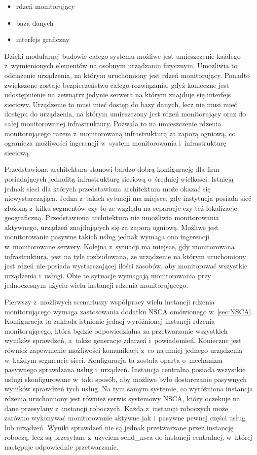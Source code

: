 \begin{itemize}
\item rdzeń monitorujący
\item baza danych
\item interfejs graficzny
\end{itemize}

Dzięki modularnej budowie całego systemu możliwe jest umieszczenie
każdego z~wymienionych elementów na osobnym urządzaniu fizycznym.
Umożliwia to odciążenie urządzenia, na którym uruchomiony jest rdzeń
monitorujący. Ponadto zwiększone zostaje bezpieczeństwo całego
rozwiązania, gdyż konieczne jest udostępnienie na zewnątrz jedynie
serwera na którym znajduje się interfejs sieciowy. Urządzenie to musi
mieć dostęp do bazy danych, lecz nie musi mieć dostępu do urządzenia,
na którym umieszczony jest rdzeń monitorujący oraz do całej
monitorowanej infrastruktury. Pozwala to na umieszczenie rdzenia
monitorującego razem z~monitorowaną infrastrukturą za zaporą ogniową,
co ogranicza możliwości ingerencji w~system monitorowania
i~infrastrukturę sieciową.

Przedstawiona architektura stanowi bardzo dobrą konfigurację dla firm
posiadających jednolitą infrastrukturę sieciową o~średniej
wielkości. Istnieją jednak sieci dla których przedstawiona
architektura może okazać się niewystarczająca. Jedna z~takich sytuacji
ma miejsce, gdy instytucja posiada sieć złożoną z~kilku segmentów czy
to ze względu na separacje czy też lokalizacje
geograficzną. Przedstawiona architektura nie umożliwia monitorowania
aktywnego, urządzeń znajdujących się za zaporą ogniową. Możliwe jest
monitorowanie pasywne takich usług jednak wymaga ono ingerencji
w~monitorowane serwery. Kolejna z~sytuacji ma miejsce, gdy
monitorowana infrastruktura, jest na tyle rozbudowana, że urządzenie
na którym uruchomiony jest rdzeń nie posiada wystarczającej ilości
zasobów, aby monitorować wszystkie urządzenia i~usługi. Obie te
sytuacje wymagają monitorowania przy jednoczesnym użyciu wielu
instancji rdzenia monitorującego.

Pierwszy z~możliwych scenariuszy współpracy wielu instancji rdzenia
monitorującego wymaga zastosowania dodatku NSCA omówionego
w~\ref{sec:NSCA}. Konfiguracja ta zakłada istnienie jednej wyróżnionej
instancji rdzenia monitorującego, która będzie odpowiedzialna za
przetwarzanie wszystkich wyników sprawdzeń, a~także generacje zdarzeń
i~powiadomień. Konieczne jest również zapewnienie możliwości
komunikacji z~co najmniej jednego urządzenia w~każdym segmencie
sieci. Konfiguracja ta została oparta o~mechanizm pasywnego sprawdzana
usług i~urządzeń. Instancja centralna posiada wszystkie usługi
skonfigurowane w~taki sposób, aby możliwe było dostarczanie pasywnych
wyników sprawdzeń tych usług. Na tym samym systemie, co wyróżniona
instancja rdzenia uruchomiony jest również serwis systemowy NSCA,
który oczekuje na dane przesyłany z~instancji roboczych. Każda
z~instancji roboczych może zarówno wykonywać monitorowanie aktywne jak
i~pasywne pewnej części usług lub urządzeń. Wyniki sprawdzeń nie są
jednak przetwarzane przez instancję roboczą, lecz są przesyłane
z~użyciem send\_nsca do instancji centralnej, w~której następuje
odpowiednie przetwarzanie.

